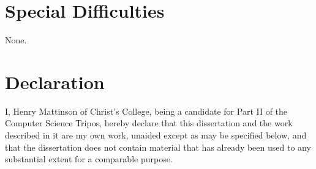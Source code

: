 \section*{Special Difficulties}

None.

\newpage
\section*{Declaration}

I, Henry Mattinson of Christ's College, being a candidate for Part II of the Computer
Science Tripos, hereby declare
that this dissertation and the work described in it are my own work,
unaided except as may be specified below, and that the dissertation
does not contain material that has already been used to any substantial
extent for a comparable purpose.

\bigskip
{}

\medskip
{}

\tableofcontents


